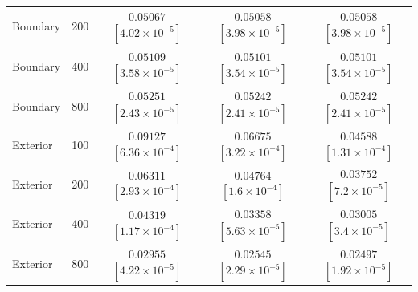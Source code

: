 \documentclass[12pt,letterpaper]{article}
\theoremstyle{plain}
\theoremstyle{definition}
\begin{document}
\begin{table}[p]
\begin{adjustbox}{max width=\linewidth}
\begin{tabular}{lrccc}
Boundary & 200 & \shortstack{$0.05067$\\{\scriptsize$[4.02\times10^{-5}]$}} & \shortstack{$0.05058$\\{\scriptsize$[3.98\times10^{-5}]$}} & \shortstack{$0.05058$\\{\scriptsize$[3.98\times10^{-5}]$}}\\
Boundary & 400 & \shortstack{$0.05109$\\{\scriptsize$[3.58\times10^{-5}]$}} & \shortstack{$0.05101$\\{\scriptsize$[3.54\times10^{-5}]$}} & \shortstack{$0.05101$\\{\scriptsize$[3.54\times10^{-5}]$}}\\
Boundary & 800 & \shortstack{$0.05251$\\{\scriptsize$[2.43\times10^{-5}]$}} & \shortstack{$0.05242$\\{\scriptsize$[2.41\times10^{-5}]$}} & \shortstack{$0.05242$\\{\scriptsize$[2.41\times10^{-5}]$}}\\
\addlinespace
Exterior & 100 & \shortstack{$0.09127$\\{\scriptsize$[6.36\times10^{-4}]$}} & \shortstack{$0.06675$\\{\scriptsize$[3.22\times10^{-4}]$}} & \shortstack{$0.04588$\\{\scriptsize$[1.31\times10^{-4}]$}}\\
Exterior & 200 & \shortstack{$0.06311$\\{\scriptsize$[2.93\times10^{-4}]$}} & \shortstack{$0.04764$\\{\scriptsize$[1.6\times10^{-4}]$}} & \shortstack{$0.03752$\\{\scriptsize$[7.2\times10^{-5}]$}}\\
Exterior & 400 & \shortstack{$0.04319$\\{\scriptsize$[1.17\times10^{-4}]$}} & \shortstack{$0.03358$\\{\scriptsize$[5.63\times10^{-5}]$}} & \shortstack{$0.03005$\\{\scriptsize$[3.4\times10^{-5}]$}}\\
Exterior & 800 & \shortstack{$0.02955$\\{\scriptsize$[4.22\times10^{-5}]$}} & \shortstack{$0.02545$\\{\scriptsize$[2.29\times10^{-5}]$}} & \shortstack{$0.02497$\\{\scriptsize$[1.92\times10^{-5}]$}}\\
\bottomrule
\end{tabular}
\end{adjustbox}

\end{table}
\end{document}
